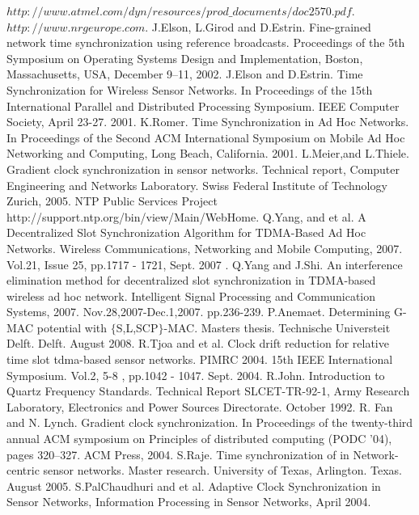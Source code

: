 \documentclass[a4paper,10pt]{report}
\begin{document}
\begin{thebibliography}{\textbf{References}}
$http://www.atmel.com/dyn/resources/prod\_documents/doc2570.pdf.$
$http://www.nrgeurope.com.$
J.Elson, L.Girod and D.Estrin. Fine-grained network time synchronization using reference broadcasts. Proceedings of the 5th Symposium on Operating Systems Design and Implementation, Boston, Massachusetts, USA, December 9–11, 2002.
J.Elson and D.Estrin. Time Synchronization for Wireless Sensor Networks. In Proceedings of the 15th International Parallel and Distributed Processing Symposium. IEEE Computer Society, April 23-27. 2001.
K.Romer. Time Synchronization in Ad Hoc Networks. In Proceedings of the Second ACM International Symposium on Mobile Ad Hoc Networking and Computing, Long Beach, California. 2001.
L.Meier,and L.Thiele. Gradient clock synchronization in sensor networks. Technical report, Computer Engineering and Networks Laboratory. Swiss Federal Institute of Technology Zurich, 2005.
NTP Public Services Project http://support.ntp.org/bin/view/Main/WebHome.
Q.Yang, and et al. A Decentralized Slot Synchronization Algorithm for TDMA-Based Ad Hoc Networks. Wireless Communications, Networking and Mobile Computing, 2007. Vol.21, Issue 25, pp.1717 - 1721, Sept. 2007 .
Q.Yang and J.Shi. An interference elimination method for decentralized slot synchronization in TDMA-based wireless ad hoc network. Intelligent Signal Processing and Communication Systems, 2007. Nov.28,2007-Dec.1,2007. pp.236-239.
P.Anemaet. Determining G-MAC potential with $\{$S,L,SCP$\}$-MAC. Masters thesis. Technische Universteit Delft. Delft. August 2008.
R.Tjoa and et al. Clock drift reduction for relative time slot tdma-based sensor networks. PIMRC 2004. 15th IEEE International Symposium. Vol.2, 5-8 , pp.1042 - 1047. Sept. 2004.
R.John. Introduction to Quartz Frequency Standards. Technical Report SLCET-TR-92-1, Army Research Laboratory, Electronics and Power Sources Directorate. October 1992.
R. Fan and N. Lynch. Gradient clock synchronization. In Proceedings of the twenty-third annual ACM symposium on Principles of distributed computing (PODC ’04), pages 320–327. ACM Press, 2004.
S.Raje. Time synchronization of in Network-centric sensor networks. Master research. University of Texas, Arlington. Texas. August 2005.
S.PalChaudhuri and et al. Adaptive Clock Synchronization in Sensor Networks, Information Processing in Sensor Networks, April 2004.
\end{thebibliography}
\end{document}
